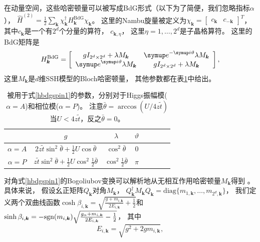 在动量空间，这些哈密顿量可以被写成BdG形式（以下为了简便，我们忽略指标$\alpha$），
$\hat{H}^{(2)} = \frac{1}{2} \sum_{\bm{k}}\chi^{ \dagger}_{\bm{k}} H^{\text{BdG}}_{\bm{k}} \chi_{\bm{k}}$。
这里的Nambu旋量被定义为$\chi_{\bm{k}} = \left[\begin{array}{cc}
c_{\bm{k}} & c_{-\bm{k}}
\end{array}\right]^T$，
其中$c_{\bm{k}}$是一个有$2^d$个分量的算符，
$c_{\bm{k}, \eta}$，
这里$\eta = 1, \ldots, 2^d$是子晶格算符。
这里的BdG矩阵是
\begin{equation}
  H^{\text{BdG}}_{\bm{k}} = \left[\begin{array}{cc}
    gI_{2^d\times 2^d} + \lambda M_{\bm{k}} & \eu^{- \iu \vartheta} \lambda M_{\bm{k}}\\
    \eu^{\iu \vartheta} \lambda M_{\bm{k}} & gI_{2^d\times 2^d} + \lambda M_{\bm{k}}
  \end{array}\right], \label{hbdgspin1}
\end{equation}
这里$M_{\bm{k}}$是$d$维SSH模型的Bloch哈密顿量，
其他参数都在表\ref{tab:parameters}中给出。%
\begin{table}[htb]
\centering
\caption{被用于式\eqref{hbdgspin1}的参数，分别对于Higgs振幅模($\alpha = A$)和相位模($\alpha = P$)。
注意$\bar\theta=\arccos(U/4z\tilde t)$当$U<4z\tilde t$，反之$\bar\theta =0$。}
\label{tab:parameters}
\begin{tabular}{cccccccc}
\toprule
 &$g$ &$\lambda$ &$\vartheta$\\
\midrule
$\alpha=A$ & $2z\tilde t \sin^2\bar\theta +\frac{1}{2}U\cos\bar\theta$ & $\cos^2\bar\theta$ & $0$ \\
$\alpha=P$ & $z\tilde t\sin^2\bar\theta + \frac{1}{2}U\cos^2\frac{1}{2}\bar\theta$ & $\cos^2\frac{1}{2}\bar\theta$ & $\pi$\\
\bottomrule
\end{tabular}
\end{table}
对角式\eqref{hbdgspin1}的Bogoliubov变换可以解析地从无相互作用哈密顿量$M_{\bm{k}}$得到 \cite{Kumar2020}。
具体来说，
假设幺正矩阵$Q_{\bm{k}}$对角$M_{\bm{k}}$，
$Q_{\bm{k}}^{ \dagger} M_{\bm{k}} Q_{\bm{k}} = \text{diag} \{m_{1, \bm{k}}, \ldots, m_{2^d, \bm{k}} \}$，
我们定义两个双曲线函数$\cosh\beta_{i, \bm{k}} = \sqrt{\frac{g + m_{i, \bm{k}}}{2 E_{i,\bm{k}}} + \frac{1}{2}}$和
$\sinh \beta_{i, \bm{k}} = - \textnormal{sgn}(m_{i, \bm{k}}) \sqrt{\frac{g_{\alpha} + m_{i, \bm{k}}}{2 E_{i,\bm{k}}} - \frac{1}{2}}$，
其中
\begin{equation}
  E_{i, \bm{k}} = \sqrt{g^2 + 2 g m_{i, \bm{k}}}, \label{eb}
\end{equation}
